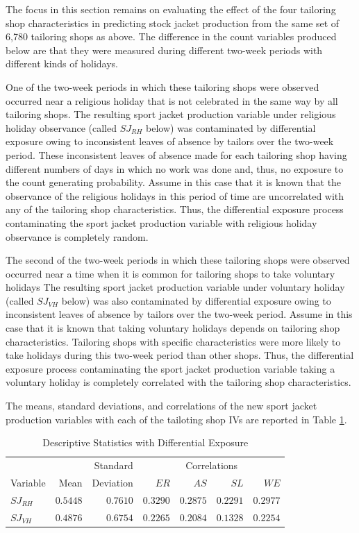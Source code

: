 \documentclass[ShortAfour,times,sageapa]{sagej}
\begin{document}
	The focus in this section remains on evaluating the effect of the four tailoring shop characteristics in predicting stock jacket production from the same set of 6,780 tailoring shops as above. 
	The difference in the count variables produced below are that they were measured during different two-week periods with different kinds of holidays.
	
	One of the two-week periods in which these tailoring shops were observed occurred near a religious holiday that is not celebrated in the same way by all tailoring shops.
	The resulting sport jacket production variable under religious holiday observance (called $SJ_{RH}$ below) was contaminated by differential exposure owing to inconsistent leaves of absence by tailors over the two-week period.
	These inconsistent leaves of absence made for each tailoring shop having different numbers of days in which no work was done and, thus, no exposure to the count generating probability.
	Assume in this case that it is known that the observance of the religious holidays in this period of time are uncorrelated with any of the tailoring shop characteristics. 
	Thus, the differential exposure process contaminating the sport jacket production variable with religious holiday observance is completely random.
	
	The second of the two-week periods in which these tailoring shops were observed occurred near a time when it is common for tailoring shops to take voluntary holidays
	The resulting sport jacket production variable under voluntary holiday (called $SJ_{VH}$ below) was also contaminated by differential exposure owing to inconsistent leaves of absence by tailors over the two-week period.
	Assume in this case that it is known that taking voluntary holidays depends on tailoring shop characteristics.
	Tailoring shops with specific characteristics were more likely to take holidays during this two-week period than other shops.
	Thus, the differential exposure process contaminating the sport jacket production variable taking a voluntary holiday is completely correlated with the tailoring shop characteristics.
	
	The means, standard deviations, and correlations of the new sport jacket production variables with each of the tailoting shop IVs are reported in Table \ref{tab:dscEx}.
	
	\begin{table}[h!]
		\centering
		\caption{\centering Descriptive Statistics with Differential Exposure}
		\begin{tabular}{lrrrrrr}
			\toprule
			&  &  Standard & \multicolumn{4}{c}{Correlations} \\ 
			\cmidrule(lr){4-7}
			Variable & Mean & Deviation & $ER$ & $AS$ & $SL$ & $WE$ \\ 
			\midrule
			$SJ_{RH}$ & $0.5448$ & $0.7610$ & $0.3290$ & $0.2875$ & $0.2291$ & $0.2977$ \\  
			$SJ_{VH}$ & $0.4876$ & $0.6754$ & $0.2265$ & $0.2084$ & $0.1328$ & $0.2254$ \\
			\bottomrule
		\end{tabular}
		\label{tab:dscEx}
	\end{table}
	
\end{document}
